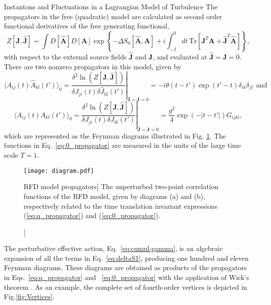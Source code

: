 \begin{chapter}{Instantons and Fluctuations in a Lagrangian Model of Turbulence}
The propagators in the free (quadratic) model are calculated as second order functional derivatives of the free generating functional,
\begin{equation}
 Z[{\mathbf{J}},\hat {\mathbf{J}}] = \int D[\hat {\mathbf{A}}] D[{\mathbf{A}}] \exp \left\{ - \Delta S_0[\hat {\mathbf{A}}, {\mathbf{A}}] +i \int_{ - \beta}^0 d t \ \mathrm{Tr} [{\mathbf{J}}^T {\mathbf{A}} + \hat{\mathbf{J}}^T \hat {\mathbf{A}}] \right\} \mbox{,}
\end{equation}
with respect to the external source fields $\hat {\mathbf{J}}$ and ${\mathbf{J}}$, and evaluated at
$\hat {\mathbf{J}} = {\mathbf{J}} = 0$. There are two nonzero propagators in this model, given by
\begin{equation} \label{eq:q_propagator}
\langle A_{ij} (t) \hat A_{kl} (t') \rangle_0 = \left. \frac{\delta^2 \ln(Z[{\mathbf{J}},\hat {\mathbf{J}}])}{\delta J_{ji}(t) \delta \hat J_{lk}(t')} \right |_{\hat {\mathbf{J}} = {\mathbf{J}}=0}= -i \theta (t-t') \exp(t'-t) \delta_{ik} \delta_{jl} \ \ \mbox{and}
\end{equation}
\begin{equation} \label{eq:0_propagator}
 \langle A_{ij} (t) A_{kl} (t') \rangle_0 =
 \left. \frac{\delta^2 \ln(Z[{\mathbf{J}},\hat {\mathbf{J}}])}{\delta J_{ji}(t) \delta J_{lk}(t')} \right |_{\hat {\mathbf{J}} = {\mathbf{J}}=0} = \frac{g^2}{4} \exp(-|t-t'|) G_{ijkl} \mbox{,}
\end{equation}
which are represented as the Feynman diagrams illustrated in Fig. \ref{fig:free-propagator}. The functions in Eq.~\eqref{eq:0_propagator} are measured in the units of the large time scale $T=1$.

\begin{figure}[ht]
 \centering
 \texttt{[image: diagram.pdf]}
 \caption
 [RFD model propagators]
 {The unperturbed two-point correlation functions of the RFD model, given by diagrams (a) and (b), respectively related to the time translation invariant expressions (\ref{eq:q_propagator}) and (\ref{eq:0_propagator}).}
 \label{fig:free-propagator}
\end{figure}

The perturbative effective action, Eq.~\eqref{eq:cumul-gamma}, is an algebraic expansion of all the terms in Eq.~\eqref{eq:deltaS1}, producing one hundred and eleven Feynman diagrams. These diagrams are obtained as products of the propagators in Eqs.~\eqref{eq:q_propagator} and ~\eqref{eq:0_propagator} with the application of Wick's theorem \parencite{amit2005,zinn2002}.
As an example, the complete set of fourth-order vertices is depicted in Fig.\ref{fig:Vertices}.



\end{chapter}
